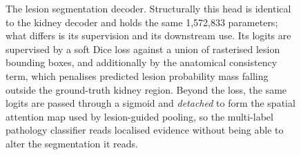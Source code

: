 \begin{figure}[t]
{\begin{tikzpicture}
\end{tikzpicture}}
\caption{The lesion segmentation decoder. Structurally this head is identical to the kidney decoder and holds the same 1,572,833 parameters; what differs is its supervision and its downstream use. Its logits are supervised by a soft Dice loss against a union of rasterised lesion bounding boxes, and additionally by the anatomical consistency term, which penalises predicted lesion probability mass falling outside the ground-truth kidney region. Beyond the loss, the same logits are passed through a sigmoid and \emph{detached} to form the spatial attention map used by lesion-guided pooling, so the multi-label pathology classifier reads localised evidence without being able to alter the segmentation it reads.}\label{fig:lesion-decoder}
\end{figure}
